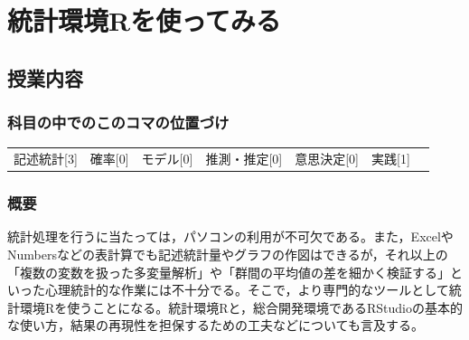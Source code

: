 \section{統計環境Rを使ってみる}
\label{D1_lesson05}

\subsection{授業内容}
\subsubsection{科目の中でのこのコマの位置づけ}
\begin{tabular}[t]{ccccccc}
    記述統計[3] & 確率[0] & モデル[0] & 推測・推定[0] & 意思決定[0] & 実践[1]
\end{tabular}
\subsubsection{概要}
統計処理を行うに当たっては，パソコンの利用が不可欠である。また，ExcelやNumbersなどの表計算でも記述統計量やグラフの作図はできるが，それ以上の「複数の変数を扱った多変量解析」や「群間の平均値の差を細かく検証する」といった心理統計的な作業には不十分でる。そこで，より専門的なツールとして統計環境Rを使うことになる。統計環境Rと，総合開発環境であるRStudioの基本的な使い方，結果の再現性を担保するための工夫などについても言及する。
